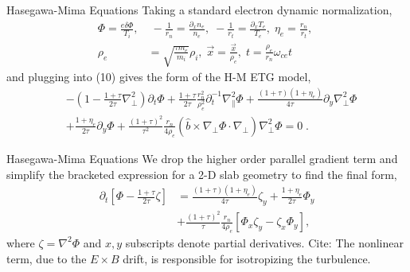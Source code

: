 \documentclass[aspectratio=43]{beamer}
\begin{document}
   \begin{frame}{Hasegawa-Mima Equations}
      \quad Taking a standard electron dynamic normalization,
      \begin{equation}
      \begin{aligned}
         \Phi    = \frac{e\delta\Phi}{T_i},&\; -\frac{1}{r_n}=\frac{\partial_x n_e}{n_e},\; -\frac{1}{r_t}=\frac{\partial_x T_e}{T_e},\; \eta_e=\frac{r_n}{r_t},\; \\
         \rho_e &= \sqrt{\frac{\tau m_e}{m_i}}\rho_i,\; \vec{x} = \frac{\vec{x}}{\rho_e},\; t=\frac{\rho_e}{r_n}\omega_{ce}t
      \end{aligned}
      \end{equation}
   and plugging into (10) gives the form of the H-M ETG model,
      \begin{equation}
      \begin{aligned}
         &-(1-\frac{1+\tau}{2\tau}\nabla_{\perp}^2)\partial_t\Phi + \frac{1+\tau}{2\tau}\frac{r_n^2}{\rho_e^2}\partial_t^{-1}\nabla_{\parallel}^2\Phi
          + \frac{(1+\tau)(1+\eta_e)}{4\tau}\partial_y\nabla_{\perp}^2\Phi \\
         &+ \frac{1+\eta_e}{2\tau}\partial_y\Phi + \frac{(1+\tau)^2}{\tau^2}\frac{r_n}{4\rho_e}(\hat{b}\times\nabla_{\perp}\Phi\cdot\nabla_{\perp})\nabla_{\perp}^2\Phi = 0\;.
      \end{aligned}
      \end{equation}
   \end{frame}

   \begin{frame}{Hasegawa-Mima Equations}
      \quad We drop the higher order parallel gradient term and simplify the bracketed expression for a 2-D slab geometry to find the final
   form,
      \begin{equation}
      \begin{aligned}
         \partial_t[\Phi-\frac{1+\tau}{2\tau}\zeta] &= \frac{(1+\tau)(1+\eta_e)}{4\tau}\zeta_y + \frac{1+\eta_e}{2\tau}\Phi_y \\
                                                    &+ \frac{(1+\tau)^2}{\tau}\frac{r_n}{4\rho_e}[\Phi_x\zeta_y-\zeta_x\Phi_y],
      \end{aligned}
      \end{equation}
   where $\zeta = \nabla^2\Phi$ and $x,y$ subscripts denote partial derivatives. Cite: The nonlinear term, due to the $E\times B$ drift, is responsible for isotropizing the turbulence.
   \end{frame}
\end{document}
